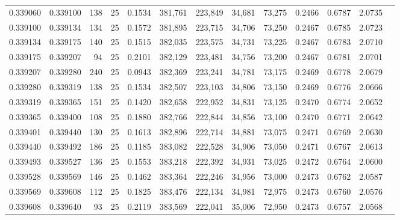 \begin{tabular}{rrrrrrrrrrrrr}
0.339060 & 0.339100 &   138 &  25 &                                     0.1534 & 381,761 & 223,849 &  34,681 &  73,275 & 0.2466 & 0.6787 & 2.0735 \\
0.339100 & 0.339134 &   134 &  25 &                                     0.1572 & 381,895 & 223,715 &  34,706 &  73,250 & 0.2467 & 0.6785 & 2.0723 \\
0.339134 & 0.339175 &   140 &  25 &                                     0.1515 & 382,035 & 223,575 &  34,731 &  73,225 & 0.2467 & 0.6783 & 2.0710 \\
0.339175 & 0.339207 &    94 &  25 &                                     0.2101 & 382,129 & 223,481 &  34,756 &  73,200 & 0.2467 & 0.6781 & 2.0701 \\
0.339207 & 0.339280 &   240 &  25 &                                     0.0943 & 382,369 & 223,241 &  34,781 &  73,175 & 0.2469 & 0.6778 & 2.0679 \\
0.339280 & 0.339319 &   138 &  25 &                                     0.1534 & 382,507 & 223,103 &  34,806 &  73,150 & 0.2469 & 0.6776 & 2.0666 \\
0.339319 & 0.339365 &   151 &  25 &                                     0.1420 & 382,658 & 222,952 &  34,831 &  73,125 & 0.2470 & 0.6774 & 2.0652 \\
0.339365 & 0.339400 &   108 &  25 &                                     0.1880 & 382,766 & 222,844 &  34,856 &  73,100 & 0.2470 & 0.6771 & 2.0642 \\
0.339401 & 0.339440 &   130 &  25 &                                     0.1613 & 382,896 & 222,714 &  34,881 &  73,075 & 0.2471 & 0.6769 & 2.0630 \\
0.339440 & 0.339492 &   186 &  25 &                                     0.1185 & 383,082 & 222,528 &  34,906 &  73,050 & 0.2471 & 0.6767 & 2.0613 \\
0.339493 & 0.339527 &   136 &  25 &                                     0.1553 & 383,218 & 222,392 &  34,931 &  73,025 & 0.2472 & 0.6764 & 2.0600 \\
0.339528 & 0.339569 &   146 &  25 &                                     0.1462 & 383,364 & 222,246 &  34,956 &  73,000 & 0.2473 & 0.6762 & 2.0587 \\
0.339569 & 0.339608 &   112 &  25 &                                     0.1825 & 383,476 & 222,134 &  34,981 &  72,975 & 0.2473 & 0.6760 & 2.0576 \\
0.339608 & 0.339640 &    93 &  25 &                                     0.2119 & 383,569 & 222,041 &  35,006 &  72,950 & 0.2473 & 0.6757 & 2.0568 \\

\end{tabular}
